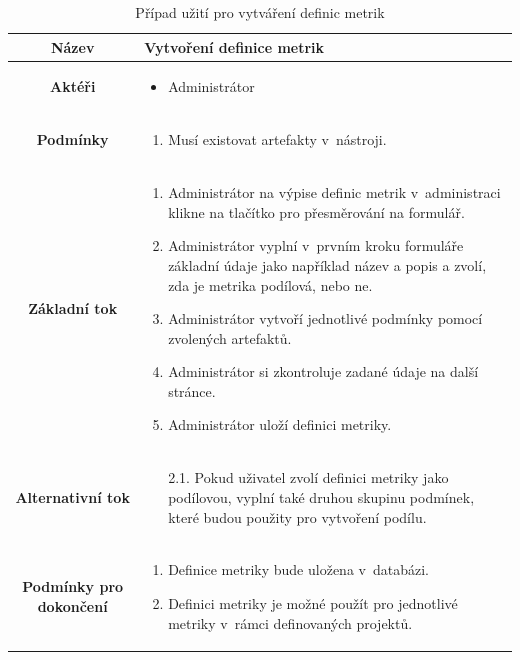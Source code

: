 \documentclass[czech,master]{diploma}
\begin{document}
\begin{table}[htp]
\begin{center}
\begin{tabular}{c | m{10cm}}

\textbf{Název} & Vytvoření definice metrik \\ 
\hline
\textbf{Aktéři} & 
\begin{itemize}
\item Administrátor
\end{itemize}
\\ 
\hline
\textbf{Podmínky} & 
\begin{enumerate}
\item Musí existovat artefakty v~nástroji.
\end{enumerate}
 
\\ 
\hline
\textbf{Základní tok} &                                                                              
\begin{enumerate}
\item Administrátor na výpise definic metrik v~administraci klikne na tlačítko pro přesměrování na formulář.
\item Administrátor vyplní v~prvním kroku formuláře základní údaje jako například název a popis a zvolí, zda je metrika podílová, nebo ne.
\item Administrátor vytvoří jednotlivé podmínky pomocí zvolených artefaktů.
\item Administrátor si zkontroluje zadané údaje na další stránce.
\item Administrátor uloží definici metriky.
\end{enumerate}                                                                                        \\ 
\hline

\textbf{Alternativní tok} &            
\begin{itemize}
    \item [2.1.] Pokud uživatel zvolí definici metriky jako podílovou, vyplní také druhou skupinu podmínek, které budou použity pro vytvoření podílu.
\end{itemize}
\\ 
\hline

\textbf{Podmínky pro dokončení} & 
\begin{enumerate}
\item Definice metriky bude uložena v~databázi.
\item Definici metriky je možné použít pro jednotlivé metriky v~rámci definovaných projektů.
\end{enumerate}                                                                                          
\end{tabular}
\caption{Případ užití pro vytváření definic metrik}
\label{tab:use_case_definition_metric}
\end{center}
\end{table}
\end{document}
